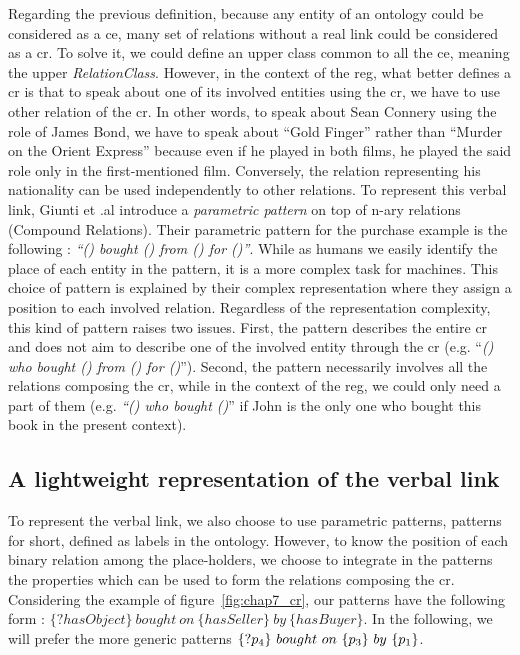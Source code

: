 Regarding the previous definition, because any entity of an ontology could be considered as a \acrshort{ce}, many set of relations without a real link could be considered as a \acrshort{cr}. To solve it, we could define an upper class common to all the \acrshort{ce}, meaning the upper \textit{RelationClass}. However, in the context of the \acrshort{reg}, what better defines a \acrshort{cr} is that to speak about one of its involved entities using the \acrshort{cr}, we have to use other relation of the \acrshort{cr}. In other words, to speak about Sean Connery using the role of James Bond, we have to speak about ``Gold Finger'' rather than ``Murder on the Orient Express'' because even if he played in both films, he played the said role only in the first-mentioned film. Conversely, the relation representing his nationality can be used independently to other relations. To represent this verbal link, Giunti et .al \cite{giunti_2019_representing} introduce a \textit{parametric pattern} on top of n-ary relations (Compound Relations). Their parametric pattern for the purchase example is the following : \textit{``() bought () from () for ()''}. While as humans we easily identify the place of each entity in the pattern, it is a more complex task for machines. This choice of pattern is explained by their complex representation where they assign a position to each involved relation. Regardless of the representation complexity, this kind of pattern raises two issues. First, the pattern describes the entire \acrshort{cr} and does not aim to describe one of the involved entity through the \acrshort{cr} (e.g. ``\textit{() who bought () from () for ()}''). Second, the pattern necessarily involves all the relations composing the \acrshort{cr}, while in the context of the \acrshort{reg}, we could only need a part of them (e.g. \textit{``() who bought ()}'' if John is the only one who bought this book in the present context).

\subsection{A lightweight representation of the verbal link}

To represent the verbal link, we also choose to use parametric patterns, patterns for short, defined as labels in the ontology. However, to know the position of each binary relation among the place-holders, we choose to integrate in the patterns the properties which can be used to form the relations composing the \acrshort{cr}. Considering the example of figure~\ref{fig:chap7_cr}, our patterns have the following form : $\{?hasObject\}\ bought\ on\ \{hasSeller\}\ by\ \{hasBuyer\}$. In the following, we will prefer the more generic patterns $\{?\property_4\}\ bought\ on\ \{\property_3\}\ by\ \{\property_1\}$.

